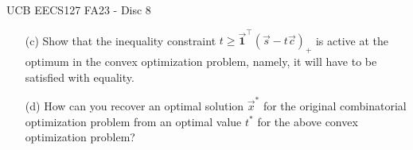 \begin{problem}{}{}{UCB EECS127 FA23 - Disc 8}
\begin{enumerate}
          \textit{Note:} You should also justify why the problem formulated in this part of the question is
          a convex optimization problem.

          \textit{Hint:} For given $t \ge 0$, express the condition ``$f(\vec{x}) \le t$ for every
          $\vec{x} \in \{0,1\}^n$''
          in simple terms. Note that this is related to the idea of introducing slack variables,
          as in Sec. 8.3.4.4 of the
          textbook of Calafiore and El Ghaoui.

    \item[(c)] Show that the inequality constraint $t \ge \vec{\mathbf{1}}^\top (\vec{s} - t\vec{c})_+$ is active at the
          optimum in the convex optimization problem, namely, it will have to be satisfied with equality.

    \item[(d)] How can you recover an optimal solution $\vec{x}^*$ for the original combinatorial optimization problem
          from an optimal value $t^*$ for the above convex optimization problem?
\end{enumerate}
\end{problem}

